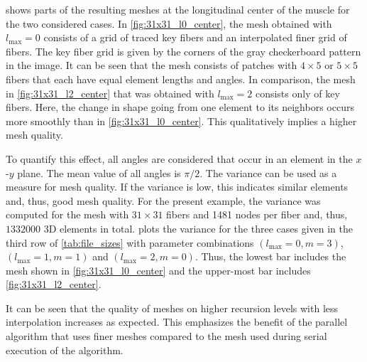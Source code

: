  shows parts of the resulting meshes at the longitudinal center of the muscle for the two considered cases.
In \cref{fig:31x31_l0_center}, the mesh obtained with $l_\text{max}=0$ consists of a grid of traced key fibers and an interpolated finer grid of fibers. The key fiber grid  is given by the corners of the gray checkerboard pattern in the image. It can be seen that the mesh consists of patches with $4 \times 5$ or $5 \times 5$ fibers that each have equal element lengths and angles. In comparison, the mesh in \cref{fig:31x31_l2_center} that was obtained with $l_\text{max}=2$ consists only of key fibers. Here, the change in shape going from one element to its neighbors occurs more smoothly than in \cref{fig:31x31_l0_center}. This qualitatively implies a higher mesh quality.

To quantify this effect, all angles are considered that occur in an element in the $x$-$y$ plane. The mean value of all angles is $\pi/2$. The variance can be used as a measure for mesh quality. If the variance is low, this indicates similar elements and, thus, good mesh quality. 
For the present example, the variance was computed for the mesh with $31 \times 31$ fibers and \num{1481} nodes per fiber and, thus, $\num{1332000}$ 3D elements in total.
 plots the variance for the three cases given in the third row of \cref{tab:file_sizes} with parameter combinations $(l_\text{max}=0,m=3)$, $(l_\text{max}=1,m=1)$ and $(l_\text{max}=2,m=0)$. Thus, the lowest bar includes the mesh shown in \cref{fig:31x31_l0_center} and the upper-most bar includes \cref{fig:31x31_l2_center}. 

It can be seen that the quality of meshes on higher recursion levels with less interpolation increases as expected.
This emphasizes the benefit of the parallel algorithm that uses finer meshes compared to the mesh used during serial execution of the algorithm.


